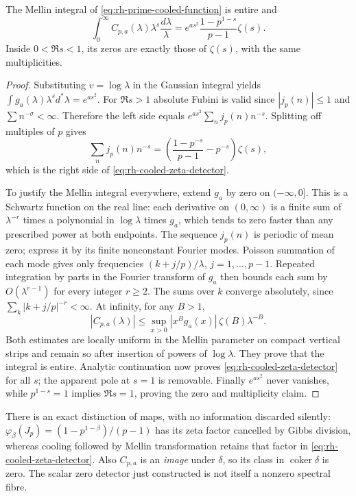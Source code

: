 \begin{proposition}
The Mellin integral of \eqref{eq:rh-prime-cooled-function} is entire and
\begin{equation}
 \int_0^\infty C_{p,a}(\lambda)\lambda^s\frac{d\lambda}{\lambda}
   =e^{as^2}\frac{1-p^{1-s}}{p-1}\zeta(s).
 \label{eq:rh-cooled-zeta-detector}
\end{equation}
Inside $0<\Re s<1$, its zeros are exactly those of $\zeta(s)$,
with the same multiplicities.
\end{proposition}
\begin{proof}
Substituting $v=\log\lambda$ in the Gaussian integral yields
$\int g_a(\lambda)\lambda^s d^*\lambda=e^{as^2}$.
For $\Re s>1$ absolute Fubini is valid since $|j_p(n)|\le1$ and
$\sum n^{-\sigma}<\infty$. Therefore the left side equals
$e^{as^2}\sum_n j_p(n)n^{-s}$. Splitting off multiples of $p$ gives
\[
 \sum_n j_p(n)n^{-s}
 =\left(\frac{1-p^{-s}}{p-1}-p^{-s}\right)\zeta(s),
 \]
which is the right side of \eqref{eq:rh-cooled-zeta-detector}.

To justify the Mellin integral everywhere, extend $g_a$ by zero on
$(-\infty,0]$. This is a Schwartz function on the real line: each
derivative on $(0,\infty)$ is a finite sum of
$\lambda^{-r}$ times a polynomial in $\log\lambda$ times $g_a$,
which tends to zero faster than any prescribed power at both endpoints.
The sequence $j_p(n)$ is periodic of mean zero; express it by its
finite nonconstant Fourier modes. Poisson summation of each mode
gives only frequencies $(k+j/p)/\lambda$, $j=1,\ldots,p-1$.
Repeated integration by parts in the Fourier transform of $g_a$
then bounds each sum by $O(\lambda^{r-1})$ for every integer $r\ge2$.
The sums over $k$ converge absolutely, since
$\sum_k|k+j/p|^{-r}<\infty$. At infinity, for any $B>1$,
\[
 |C_{p,a}(\lambda)|\le
 \sup_{x>0}|x^B g_a(x)|\,\zeta(B)\lambda^{-B}.
 \]
Both estimates are locally uniform in the Mellin parameter on compact
vertical strips and remain so after insertion of powers of $\log\lambda$.
They prove that the integral is entire. Analytic continuation now proves
\eqref{eq:rh-cooled-zeta-detector} for all $s$; the apparent pole at
$s=1$ is removable.
Finally $e^{as^2}$ never vanishes, while
$p^{1-s}=1$ implies $\Re s=1$, proving the zero and multiplicity claim.
\end{proof}

There is an exact distinction of maps, with no information discarded
silently: $\varphi_\beta(J_p)=(1-p^{1-\beta})/(p-1)$ has its zeta
factor cancelled by Gibbs division, whereas cooling followed by Mellin
transformation retains that factor in \eqref{eq:rh-cooled-zeta-detector}.
Also $C_{p,a}$ is an \emph{image} under $\delta$, so its class in
$\operatorname{coker}\delta$ is zero. The scalar zero detector just
constructed is not itself a nonzero spectral fibre.

